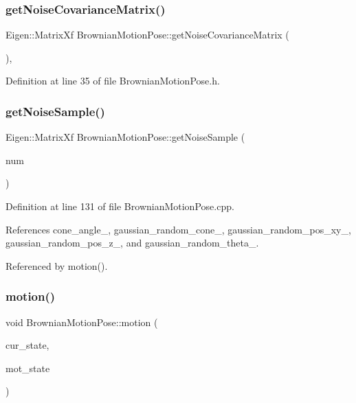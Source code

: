 \subsubsection{\texorpdfstring{get\+Noise\+Covariance\+Matrix()}{getNoiseCovarianceMatrix()}}
{\footnotesize\ttfamily Eigen\+::\+Matrix\+Xf Brownian\+Motion\+Pose\+::get\+Noise\+Covariance\+Matrix (\begin{DoxyParamCaption}{ }\end{DoxyParamCaption})\hspace{0.3cm}{\ttfamily [inline]}, {\ttfamily [override]}}



Definition at line 35 of file Brownian\+Motion\+Pose.\+h.

\mbox{\label{classBrownianMotionPose_a51407ee62d9e384af89c88c5b21c82df}} 
\subsubsection{\texorpdfstring{get\+Noise\+Sample()}{getNoiseSample()}}
{\footnotesize\ttfamily Eigen\+::\+Matrix\+Xf Brownian\+Motion\+Pose\+::get\+Noise\+Sample (\begin{DoxyParamCaption}\item[{const int}]{num }\end{DoxyParamCaption})\hspace{0.3cm}{\ttfamily [override]}}



Definition at line 131 of file Brownian\+Motion\+Pose.\+cpp.



References cone\+\_\+angle\+\_\+, gaussian\+\_\+random\+\_\+cone\+\_\+, gaussian\+\_\+random\+\_\+pos\+\_\+xy\+\_\+, gaussian\+\_\+random\+\_\+pos\+\_\+z\+\_\+, and gaussian\+\_\+random\+\_\+theta\+\_\+.



Referenced by motion().

\mbox{\label{classBrownianMotionPose_ab1587dfdc83f92d0def84de227d90ddb}} 
\subsubsection{\texorpdfstring{motion()}{motion()}}
{\footnotesize\ttfamily void Brownian\+Motion\+Pose\+::motion (\begin{DoxyParamCaption}\item[{const Eigen\+::\+Ref$<$ const Eigen\+::\+Matrix\+Xf $>$ \&}]{cur\+\_\+state,  }\item[{Eigen\+::\+Ref$<$ Eigen\+::\+Matrix\+Xf $>$}]{mot\+\_\+state }\end{DoxyParamCaption})\hspace{0.3cm}{\ttfamily [override]}}



